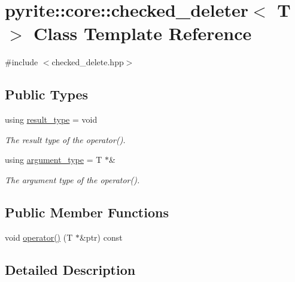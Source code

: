 \hypertarget{classpyrite_1_1core_1_1checked__deleter}{}\section{pyrite\+:\+:core\+:\+:checked\+\_\+deleter$<$ T $>$ Class Template Reference}
\label{classpyrite_1_1core_1_1checked__deleter}


{\ttfamily \#include $<$checked\+\_\+delete.\+hpp$>$}

\subsection*{Public Types}
\begin{DoxyCompactItemize}
\item 
\mbox{\label{classpyrite_1_1core_1_1checked__deleter_a9b4af33bca1305708dfa58ce7b42091a}} 
using \mbox{\hyperlink{classpyrite_1_1core_1_1checked__deleter_a9b4af33bca1305708dfa58ce7b42091a}{result\+\_\+type}} = void
\begin{DoxyCompactList}\small\item\em The result type of the operator(). \end{DoxyCompactList}\item 
\mbox{\label{classpyrite_1_1core_1_1checked__deleter_a98bbd81bf7af52f5595955fccc79433a}} 
using \mbox{\hyperlink{classpyrite_1_1core_1_1checked__deleter_a98bbd81bf7af52f5595955fccc79433a}{argument\+\_\+type}} = T $\ast$\&
\begin{DoxyCompactList}\small\item\em The argument type of the operator(). \end{DoxyCompactList}\end{DoxyCompactItemize}
\subsection*{Public Member Functions}
\begin{DoxyCompactItemize}
\item 
void \mbox{\hyperlink{classpyrite_1_1core_1_1checked__deleter_a214d518516d6f75bb36b941e4f345f6d}{operator()}} (T $\ast$\&ptr) const
\end{DoxyCompactItemize}


\subsection{Detailed Description}
